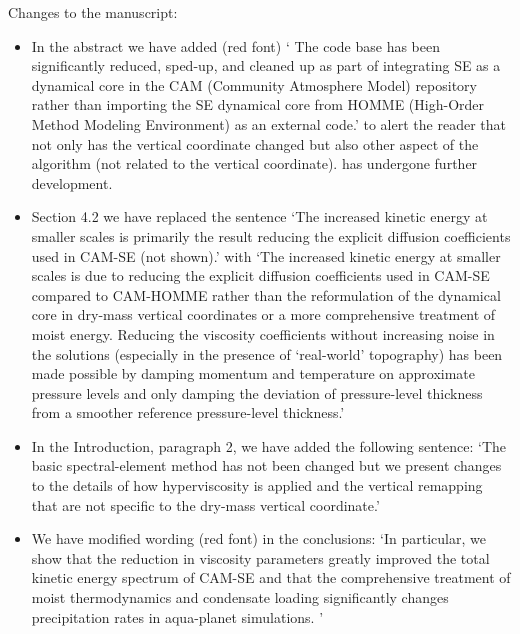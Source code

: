 \documentclass[11pt]{article}
\begin{document}
Changes to the manuscript: 
\begin{itemize}
\item In the abstract we have added (red font) `{\color{red}{Not related to the vertical coordinate change, the hyperviscosity operators and the vertical remapping algorithms have been modified.}} The code base has been significantly reduced, sped-up, and cleaned up as part of integrating SE as a dynamical core in the CAM (Community Atmosphere Model) repository rather than importing the SE dynamical core from HOMME (High-Order Method Modeling Environment) as an external code.' to alert the reader that not only has the vertical coordinate changed but also other aspect of the algorithm (not related to the vertical coordinate). has undergone further development.
\item Section 4.2 we have replaced the sentence `The increased kinetic energy at smaller scales is primarily the result reducing the explicit diffusion coefficients used in CAM-SE (not shown).' with `The increased kinetic energy at smaller scales is due to reducing the explicit diffusion coefficients used in CAM-SE compared to CAM-HOMME rather than the reformulation of the dynamical core in dry-mass vertical coordinates or a more comprehensive treatment of moist energy. Reducing the viscosity coefficients without increasing noise in the solutions (especially in the presence of `real-world' topography) has been made possible by damping momentum and temperature on approximate pressure levels and only damping the deviation of pressure-level thickness from a smoother reference pressure-level thickness.'
\item In the Introduction, paragraph 2, we have added the following sentence: `The basic spectral-element method has not been changed but we present changes to the details of how hyperviscosity is applied and the vertical remapping that are not specific to the dry-mass vertical coordinate.' 
\item We have modified wording (red font) in the conclusions: `In particular, we show that the reduction in viscosity parameters {\color{red}{(made possible by changes to the details of how hyperviscosity is applied)}} greatly improved the total kinetic energy spectrum of CAM-SE and that the comprehensive treatment of moist thermodynamics and condensate loading significantly changes precipitation rates in aqua-planet simulations. {\color{red}{These changes are not due to the dry-mass vertical coordinate per se but we argue that the comprehensive treatment of energy in the Earth system model as a whole is much simpler in a dry-mass vertical coordinate (for example, a dry-mass vertical coordinate does not change during parameterization updates).}}'


\end{itemize}
\end{document}
